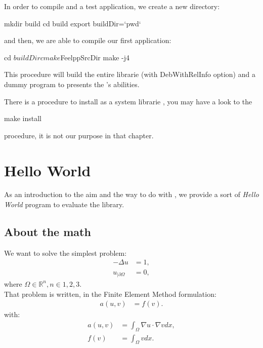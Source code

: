 In order to compile \feel and a test application, we create a new directory:
\begin{unixcom}
  mkdir build
  cd build
  export buildDir=`pwd`
\end{unixcom}

and then, we are able to compile our first application:
\begin{unixcom}
  cd $buildDir
  cmake $FeelppSrcDir
  make -j4
\end{unixcom}

This procedure will build the entire librarie (with DebWithRelInfo option) and a dummy program to presents the \feel's abilities.

There is a procedure to install as a system librarie \feel, you may have a look to the
\begin{unixcom}
  make install
\end{unixcom}
procedure, it is not our purpose in that chapter.

\section{\feel Hello World}
\label{sec:feel-hello-world}

As an introduction to the aim and the way to do with \feel, we provide a sort of
\textit{Hello World} program to evaluate the library.

\subsection{About the math}
\label{sec:about-math}

We want to solve the simplest problem:
\begin{equation}\nonumber
  \begin{aligned}
    - \Delta u &= 1,\\
    u_{|\partial \Omega} &= 0,
  \end{aligned}
\end{equation}
where $\Omega \in \mathbb{R}^n, n\in{1,2,3}$.\\

That problem is written, in the Finite Element Method formulation:
\begin{equation}\nonumber
  \begin{aligned}
    a\left( u,v \right)&=f(v).
  \end{aligned}
\end{equation}
with:
\begin{equation}\nonumber
  \begin{aligned}
    a\left( u,v \right)&=\int_{\Omega} \nabla u \cdot \nabla v dx,\\
    f\left( v \right) &= \int_{\Omega} v dx.
  \end{aligned}
\end{equation}

